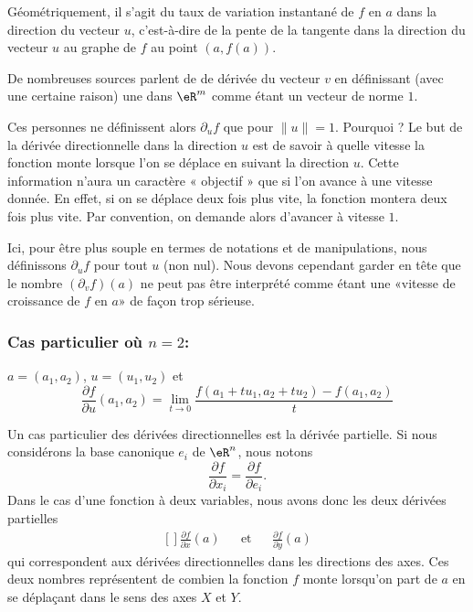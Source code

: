 Géométriquement, il s'agit du taux de variation instantané de \( f\) en \( a\) dans la direction du vecteur \( u\), c'est-à-dire de la pente de la tangente dans la direction du vecteur \( u\) au graphe de \( f\) au point \( (a, f(a))\).

\begin{remark}
	De nombreuses sources parlent de de dérivée  du vecteur \( v\) en définissant (avec une certaine raison) une  dans \( \eR^m\) comme étant un vecteur de norme \( 1\).

	Ces personnes ne définissent alors \( \partial_uf\) que pour \( \| u \|=1\). Pourquoi ? Le but de la dérivée directionnelle dans la direction \( u\) est de savoir à quelle vitesse la fonction monte lorsque l'on se déplace en suivant la direction \( u\). Cette information n'aura un caractère « objectif » que si l'on avance à une vitesse donnée. En effet, si on se déplace deux fois plus vite, la fonction montera deux fois plus vite. Par convention, on demande alors d'avancer à vitesse \( 1\).

	Ici, pour être plus souple en termes de notations et de manipulations, nous définissons \( \partial_uf\) pour tout \( u\) (non nul). Nous devons cependant garder en tête que le nombre \( (\partial_vf)(a)\) ne peut pas être interprété comme étant une «vitesse de croissance de \( f\) en \( a\)» de façon trop sérieuse.
\end{remark}

\subsubsection*{Cas particulier où \( n=2\):} \( a = (a_1, a_2)\), \( u =
(u_1,u_2)\) et
\begin{equation}
	\frac{\partial f}{\partial u}(a_1, a_2) = \lim_{t\rightarrow 0}\frac{f(a_1+tu_1,a_2+tu_2) - f(a_1, a_2)}{t}
\end{equation}

Un cas particulier des dérivées directionnelles est la dérivée partielle. Si nous considérons la base canonique \( e_i\) de \( \eR^n\), nous notons
\begin{equation}
	\frac{ \partial f }{ \partial x_i }=\frac{ \partial f }{ \partial e_i }.
\end{equation}
Dans le cas d'une fonction à deux variables, nous avons donc les deux dérivées partielles
\begin{equation}
	\begin{aligned}[]
		\frac{ \partial f }{ \partial x }(a) &  & \text{et} &  & \frac{ \partial f }{ \partial y }(a)
	\end{aligned}
\end{equation}
qui correspondent aux dérivées directionnelles dans les directions des axes. Ces deux nombres représentent de combien la fonction \( f\) monte lorsqu'on part de \( a\) en se déplaçant dans le sens des axes \( X\) et \( Y\).

